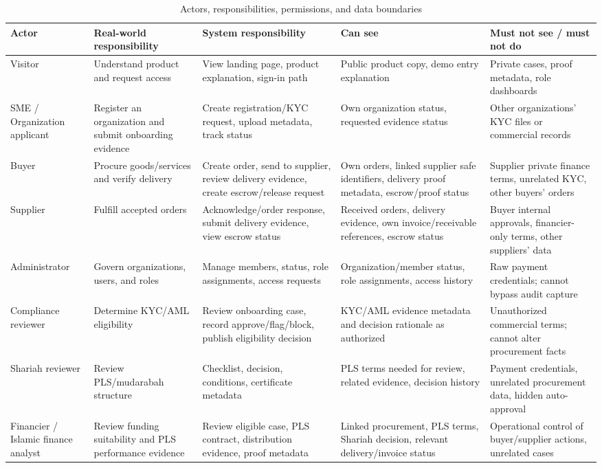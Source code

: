 \documentclass[conference]{IEEEtran}
\begin{document}
\begin{table}[t]
\caption{Actors, responsibilities, permissions, and data boundaries}
\label{tab:actors}
\scriptsize
\begin{tabularx}{\textwidth}{P{2.3cm} P{3.5cm} P{3.7cm} Y Y}
\toprule
Actor & Real-world responsibility & System responsibility & Can see & Must not see / must not do \\
\midrule
Visitor & Understand product and request access & View landing page, product explanation, sign-in path & Public product copy, demo entry explanation & Private cases, proof metadata, role dashboards \\
SME / Organization applicant & Register an organization and submit onboarding evidence & Create registration/KYC request, upload metadata, track status & Own organization status, requested evidence status & Other organizations' KYC files or commercial records \\
Buyer & Procure goods/services and verify delivery & Create order, send to supplier, review delivery evidence, create escrow/release request & Own orders, linked supplier safe identifiers, delivery proof metadata, escrow/proof status & Supplier private finance terms, unrelated KYC, other buyers' orders \\
Supplier & Fulfill accepted orders & Acknowledge/order response, submit delivery evidence, view escrow status & Received orders, delivery evidence, own invoice/receivable references, escrow status & Buyer internal approvals, financier-only terms, other suppliers' data \\
Administrator & Govern organizations, users, and roles & Manage members, status, role assignments, access requests & Organization/member status, role assignments, access history & Raw payment credentials; cannot bypass audit capture \\
Compliance reviewer & Determine KYC/AML eligibility & Review onboarding case, record approve/flag/block, publish eligibility decision & KYC/AML evidence metadata and decision rationale as authorized & Unauthorized commercial terms; cannot alter procurement facts \\
Shariah reviewer & Review PLS/mudarabah structure & Checklist, decision, conditions, certificate metadata & PLS terms needed for review, related evidence, decision history & Payment credentials, unrelated procurement data, hidden auto-approval \\
Financier / Islamic finance analyst & Review funding suitability and PLS performance evidence & Review eligible case, PLS contract, distribution evidence, proof metadata & Linked procurement, PLS terms, Shariah decision, relevant delivery/invoice status & Operational control of buyer/supplier actions, unrelated cases \\

\end{tabularx}
\end{table}
\end{document}

